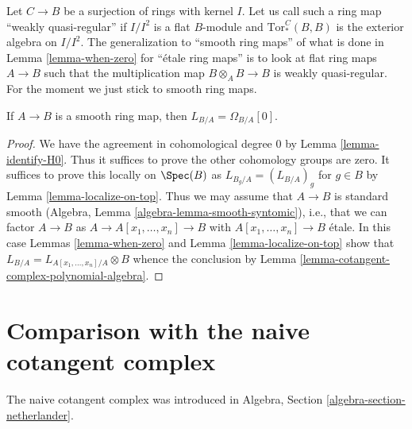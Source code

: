 \noindent
Let $C \to B$ be a surjection of rings with kernel $I$. Let us call such
a ring map ``weakly quasi-regular'' if $I/I^2$ is a flat $B$-module and
$\text{Tor}_*^C(B, B)$ is the exterior algebra on $I/I^2$.
The generalization to ``smooth ring maps'' of what is done in
Lemma \ref{lemma-when-zero} for ``\'etale ring maps'' is to look
at flat ring maps $A \to B$ such that the multiplication map
$B \otimes_A B \to B$ is weakly quasi-regular. For the moment we just stick to
smooth ring maps.

\begin{lemma}
\label{lemma-when-projective}
If $A \to B$ is a smooth ring map, then $L_{B/A} = \Omega_{B/A}[0]$.
\end{lemma}

\begin{proof}
We have the agreement in cohomological degree $0$ by
Lemma \ref{lemma-identify-H0}.
Thus it suffices to prove the other cohomology groups
are zero. It suffices to prove this locally on $\Spec(B)$ as
$L_{B_g/A} = (L_{B/A})_g$ for $g \in B$ by Lemma \ref{lemma-localize-on-top}.
Thus we may assume that $A \to B$ is standard smooth
(Algebra, Lemma \ref{algebra-lemma-smooth-syntomic}), i.e.,
that we can factor $A \to B$ as
$A \to A[x_1, \ldots, x_n] \to B$ with $A[x_1, \ldots, x_n] \to B$
\'etale. In this case Lemmas \ref{lemma-when-zero} and
Lemma \ref{lemma-localize-on-top} show that
$L_{B/A} = L_{A[x_1, \ldots, x_n]/A} \otimes B$
whence the conclusion by
Lemma \ref{lemma-cotangent-complex-polynomial-algebra}.
\end{proof}





\section{Comparison with the naive cotangent complex}
\label{section-surjections}

\noindent
The naive cotangent complex was introduced in
Algebra, Section \ref{algebra-section-netherlander}.

